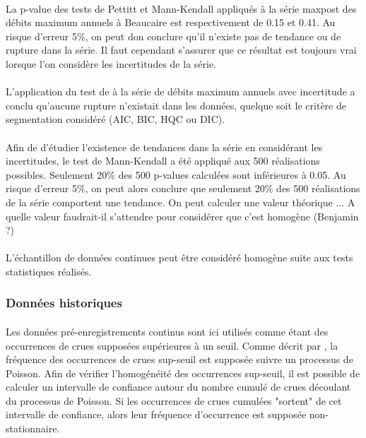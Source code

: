 \documentclass[11pt]{article}
\begin{document}
	\paragraph{} La p-value des tests de Pettitt et Mann-Kendall appliqués à la série maxpost des débits maximum annuels à Beaucaire est respectivement de 0.15 et 0.41. Au risque d'erreur 5\%, on peut don conclure qu'il n'existe pas de tendance ou de rupture dans la série. Il faut cependant s'assurer que ce résultat est toujours vrai lorsque l'on considère les incertitudes de la série.
			
	\paragraph{} L'application du test de \citep{darienzo_detection_2021-1} à la série de débits maximum annuels avec incertitude a conclu qu'aucune rupture n'existait dans les données, quelque soit le critère de segmentation considéré (AIC, BIC, HQC ou DIC). 
	
	\paragraph{} Afin de d'étudier l'existence de tendances dans la série en considérant les incertitudes, le test de Mann-Kendall a été appliqué aux 500 réalisations possibles. Seulement 20\% des 500 p-values calculées sont inférieures à 0.05. Au risque d'erreur 5\%, on peut alors conclure que seulement 20\% des 500 réalisations de la série comportent une tendance. On peut calculer une valeur théorique ... A quelle valeur faudrait-il s'attendre pour considérer que c'est homogène (Benjamin ?) 
	
	\paragraph{} L'échantillon de données continues peut être considéré homogène suite aux tests statistiques réalisés. 
	
		
	\subsubsection{Données historiques}
	
	\paragraph{} Les données pré-enregistrements continus sont ici utilisés comme étant des occurrences de crues supposées supérieures à un seuil. Comme décrit par \citet{lang_towards_1999}, la fréquence des occurrences de crues sup-seuil est supposée suivre un processus de Poisson. Afin de vérifier l'homogénéité des occurrences sup-seuil, il est possible de calculer un intervalle de confiance autour du nombre cumulé de crues découlant du processus de Poisson. Si les occurrences de crues cumulées "sortent" de cet intervalle de confiance, alors leur fréquence d'occurrence est supposée non-stationnaire. 
	
\end{document}
